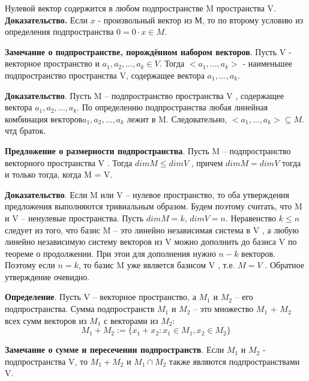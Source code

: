 \documentclass[a4paper]{article}
\begin{document}
Нулевой вектор содержится в любом подпространстве M пространства V.
\textbf{Доказательство.} Если $x$ - произвольный вектор из М, то по второму условию из определения подпространства $0 = 0 \cdot x \in M$.

\begin{htheorem}
\textbf{Замечание о подпространстве, порождённом набором векторов}. Пусть V - векторное пространство и $a_1, a_2, ..., a_k \in V$. Тогда $<a_1, ..., a_k>$ - наименьшее подпространство пространства V, содержащее вектора $a_1, ..., a_k$.
\end{htheorem}


\begin{hproof}
\textbf{Доказательство}. Пусть M – подпространство пространства V , содержащее
вектора $a_1, a_2, ..., a_k$. По определению подпространства любая линейная
комбинация векторов$a_1, a_2, ..., a_k$ лежит в M. Следовательно,
$<a_1, ..., a_k> \subseteq M$. чтд браток.
\end{hproof}


\begin{htheorem}
\textbf{Предложение о размерности подпространства}. 
Пусть M – подпространство векторного пространства V . Тогда
$dim M \leq dim V$ , причем $dim M = dim V$ тогда и только тогда, когда
M = V.
\end{htheorem}

\begin{hproof}
\textbf{Доказательство}. Если M или V – нулевое пространство, то оба
утверждения предложения выполняются тривиальным образом. Будем
поэтому считать, что M и V – ненулевые пространства. Пусть $dim M = k$,
$dim V = n$. Неравенство $k \leq n$ следует из того, что базис M – это линейно
независимая система в V , а любую линейно независимую систему
векторов из V можно дополнить до базиса V по теореме о продолжении. При этои для дополнения нужно $n-k$ векторов. Поэтому если $n=k$, то базис M уже является базисом V , т.е. $M = V$ . Обратное утверждение очевидно.
\end{hproof}

\textbf{Определение}. Пусть V – векторное пространство, а $M_1$ и $M_2$ – его подпространства.
Сумма подпространств $M_1$ и $M_2$ – это множество $M_1$ + $M_2$ всех сумм
векторов из $M_1$ с векторами из $M_2$:
\begin{equation}
M_1+M_2 := \{ x_1 + x_2: x_1 \in M_1, x_2 \in M_2 \}
\end{equation}

\begin{htheorem}
\textbf{Замечание о сумме и пересечении подпространств}. Если $M_1$ и $M_2$ - подпространства V, то $M_1+M_2$ и $M_1 \cap M_2$ также являются подпространствами V.
\end{htheorem}
\end{document}
